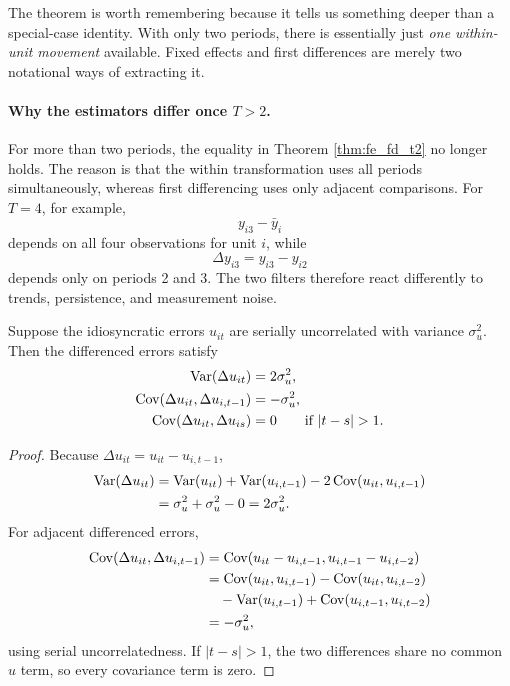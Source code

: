 The theorem is worth remembering because it tells us something deeper than a special-case identity. With only two periods, there is essentially just \emph{one within-unit movement} available. Fixed effects and first differences are merely two notational ways of extracting it.

\paragraph{Why the estimators differ once $T>2$.}
For more than two periods, the equality in Theorem \ref{thm:fe_fd_t2} no longer holds. The reason is that the within transformation uses all periods simultaneously, whereas first differencing uses only adjacent comparisons. For $T=4$, for example,
\[
y_{i3}-\bar{y}_i
\]
depends on all four observations for unit $i$, while
\[
\Delta y_{i3}=y_{i3}-y_{i2}
\]
depends only on periods 2 and 3. The two filters therefore react differently to trends, persistence, and measurement noise.

\begin{thmN}
Suppose the idiosyncratic errors $u_{it}$ are serially uncorrelated with variance $\sigma_u^2$. Then the differenced errors satisfy
\begin{align}
\Var(\Delta u_{it}) &= 2\sigma_u^2,
\label{eq:fd_var}
\\
\Cov(\Delta u_{it},\Delta u_{i,t-1}) &= -\sigma_u^2,
\label{eq:fd_cov_adjacent}
\\
\Cov(\Delta u_{it},\Delta u_{is}) &= 0
\qquad \text{if } |t-s|>1.
\label{eq:fd_cov_nonadjacent}
\end{align}
\end{thmN}

\begin{proof}
Because $\Delta u_{it}=u_{it}-u_{i,t-1}$,
\begin{align*}
\operatorname{Var}(\Delta u_{it})
&= \operatorname{Var}(u_{it})+\operatorname{Var}(u_{i,t-1})-2\operatorname{Cov}(u_{it},u_{i,t-1}) \\
&= \sigma_u^2+\sigma_u^2-0
=2\sigma_u^2.
\end{align*}
For adjacent differenced errors,
\begin{align*}
\operatorname{Cov}(\Delta u_{it},\Delta u_{i,t-1})
&= \operatorname{Cov}(u_{it}-u_{i,t-1},u_{i,t-1}-u_{i,t-2}) \\
&= \operatorname{Cov}(u_{it},u_{i,t-1})-\operatorname{Cov}(u_{it},u_{i,t-2}) \\
&\quad -\operatorname{Var}(u_{i,t-1})+\operatorname{Cov}(u_{i,t-1},u_{i,t-2}) \\
&= -\sigma_u^2,
\end{align*}
using serial uncorrelatedness. If $|t-s|>1$, the two differences share no common $u$ term, so every covariance term is zero.
\end{proof}


